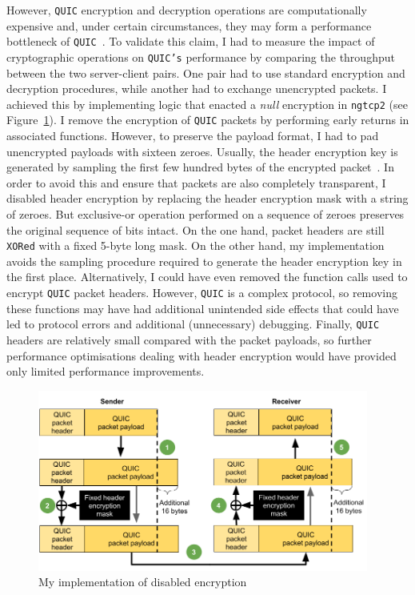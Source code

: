 \documentclass[12pt,a4paper,twoside,openright]{report}
\begin{document}
However, \texttt{QUIC} encryption and decryption operations are computationally expensive and, under certain circumstances, they may form a performance bottleneck of \texttt{QUIC}~\cite{Making_QUIC_Quicker}.
To validate this claim, I had to measure the impact of cryptographic operations on \texttt{QUIC's} performance by comparing the throughput between the two server-client pairs.
One pair had to use standard encryption and decryption procedures, while another had to exchange unencrypted packets.
I achieved this by implementing logic that enacted a \textit{null} encryption in \texttt{ngtcp2} (see Figure~\ref{fig:my_implementation_of_cryptographic_procedures_of_quic}).
I remove the encryption of \texttt{QUIC} packets by performing early returns in associated functions.
However, to preserve the payload format, I had to pad unencrypted payloads with sixteen zeroes.
Usually, the header encryption key is generated by sampling the first few hundred bytes of the encrypted packet~\cite[Section 5.4.1]{ietf-quic-tls-32}. 
In order to avoid this and ensure that packets are also completely transparent, I disabled header encryption by replacing the header encryption mask with a string of zeroes.
But exclusive-or operation performed on a sequence of zeroes preserves the original sequence of bits intact.
On the one hand, packet headers are still \texttt{XORed} with a fixed 5-byte long mask.
On the other hand, my implementation avoids the sampling procedure required to generate the header encryption key in the first place.
Alternatively, I could have even removed the function calls used to encrypt \texttt{QUIC} packet headers.
However, \texttt{QUIC} is a complex protocol, so removing these functions may have had additional unintended side effects that could have led to protocol errors and additional (unnecessary) debugging.
Finally, \texttt{QUIC} headers are relatively small compared with the packet payloads, so further performance optimisations dealing with header encryption would have provided only limited performance improvements.


    \begin{figure}[H]
    \centering
    \includegraphics[width=0.97\textwidth]{figs/my_implementation_of_cryptographic_procedures_of_quic.png}
    \caption[My implementation of disabled encryption]{My implementation of disabled encryption}
    \label{fig:my_implementation_of_cryptographic_procedures_of_quic}
    \end{figure}
\end{document}
